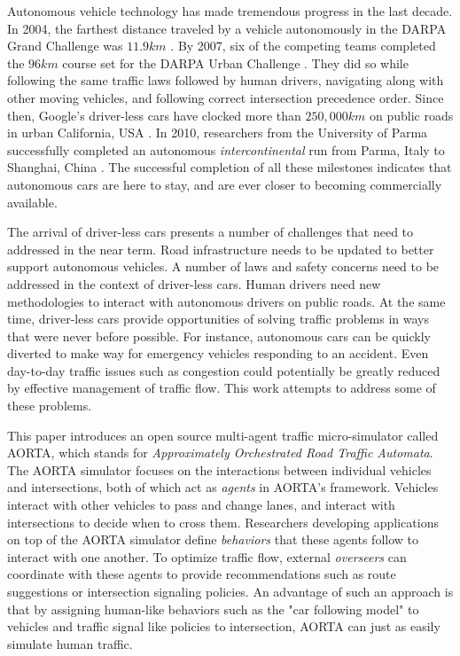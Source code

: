 \documentclass[letterpaper, 10 pt, conference]{ieeeconf}  %
\begin{document}
Autonomous vehicle technology has made tremendous progress in the last decade. In 2004, the farthest distance traveled by a vehicle autonomously in the DARPA Grand Challenge was $11.9km$ \cite{cnnGrandChallenge2004}. By 2007, six of the competing teams completed the $96km$ course set for the DARPA Urban Challenge \cite{spectrumUrbanChallenge2007}. They did so while following the same traffic laws followed by human drivers, navigating along with other moving vehicles, and following correct intersection precedence order. Since then, Google's driver-less cars have clocked more than $250,000km$ on public roads in urban California, USA \cite{tedThrun2011}. In 2010, researchers from the University of Parma successfully completed an autonomous \textit{intercontinental} run from Parma, Italy to Shanghai, China \cite{cnnVislab2010}. The successful completion of all these milestones indicates that autonomous cars are here to stay, and are ever closer to becoming commercially available. 

The arrival of driver-less cars presents a number of challenges that need to addressed in the near term. Road infrastructure needs to be updated to better support autonomous vehicles. A number of laws and safety concerns need to be addressed in the context of driver-less cars. Human drivers need new methodologies to interact with autonomous drivers on public roads. At the same time, driver-less cars provide opportunities of solving traffic problems in ways that were never before possible. For instance, autonomous cars can be quickly diverted to make way for emergency vehicles responding to an accident. Even day-to-day traffic issues such as congestion could potentially be greatly reduced by effective management of traffic flow. This work attempts to address some of these problems.

This paper introduces an open source multi-agent traffic micro-simulator called AORTA, which stands for \textit{Approximately Orchestrated Road Traffic Automata}. The AORTA simulator focuses on the interactions between individual vehicles and intersections, both of which act as \textit{agents} in AORTA's framework. Vehicles interact with other vehicles to pass and change lanes, and interact with intersections to decide when to cross them. Researchers developing applications on top of the AORTA simulator define \textit{behaviors} that these agents follow to interact with one another. To optimize traffic flow, external \textit{overseers} can coordinate with these agents to provide recommendations such as route suggestions or intersection signaling policies. An advantage of such an approach is that by assigning human-like behaviors such as the "car following model" \cite{brackstone1999car} to vehicles and traffic signal like policies to intersection, AORTA can just as easily simulate human traffic.
\end{document}
